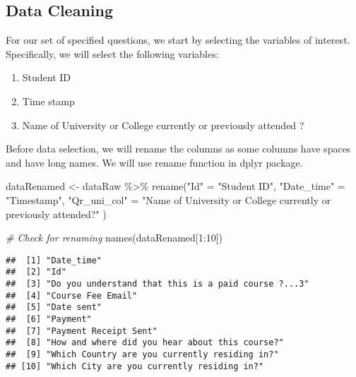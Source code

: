 \documentclass[
]{article}
\newenvironment{Shaded}{\begin{snugshade}}{\end{snugshade}}
\newcommand{\CommentTok}[1]{\textcolor[rgb]{0.56,0.35,0.01}{\textit{#1}}}
\newcommand{\DecValTok}[1]{\textcolor[rgb]{0.00,0.00,0.81}{#1}}
\newcommand{\FunctionTok}[1]{\textcolor[rgb]{0.00,0.00,0.00}{#1}}
\newcommand{\NormalTok}[1]{#1}
\newcommand{\OtherTok}[1]{\textcolor[rgb]{0.56,0.35,0.01}{#1}}
\newcommand{\SpecialCharTok}[1]{\textcolor[rgb]{0.00,0.00,0.00}{#1}}
\newcommand{\StringTok}[1]{\textcolor[rgb]{0.31,0.60,0.02}{#1}}
\providecommand{\tightlist}{%
  \setlength{\itemsep}{0pt}\setlength{\parskip}{0pt}}
\begin{document}
\hypertarget{data-cleaning}{%
\subsection{Data Cleaning}\label{data-cleaning}}

For our set of specified questions, we start by selecting the variables
of interest. Specifically, we will select the following variables:

\begin{enumerate}
\def\labelenumi{\arabic{enumi}.}
\tightlist
\item
  Student ID
\item
  Time stamp
\item
  Name of University or College currently or previously attended ?
\end{enumerate}

Before data selection, we will rename the columns as some columns have
spaces and have long names. We will use rename function in dplyr
package.

\begin{Shaded}
\begin{Highlighting}[]
\NormalTok{dataRenamed }\OtherTok{\textless{}{-}}\NormalTok{ dataRaw }\SpecialCharTok{\%\textgreater{}\%}
  \FunctionTok{rename}\NormalTok{(}\StringTok{"Id"} \OtherTok{=} \StringTok{"Student ID"}\NormalTok{,}
         \StringTok{"Date\_time"} \OtherTok{=} \StringTok{"Timestamp"}\NormalTok{,}
         \StringTok{"Qr\_uni\_col"} \OtherTok{=} \StringTok{"Name of University or College currently or previously attended?"}
\NormalTok{         )}

\CommentTok{\# Check for renaming}
\FunctionTok{names}\NormalTok{(dataRenamed[}\DecValTok{1}\SpecialCharTok{:}\DecValTok{10}\NormalTok{])}
\end{Highlighting}
\end{Shaded}

\begin{verbatim}
##  [1] "Date_time"                                         
##  [2] "Id"                                                
##  [3] "Do you understand that this is a paid course ?...3"
##  [4] "Course Fee Email"                                  
##  [5] "Date sent"                                         
##  [6] "Payment"                                           
##  [7] "Payment Receipt Sent"                              
##  [8] "How and where did you hear about this course?"     
##  [9] "Which Country are you currently residing in?"      
## [10] "Which City are you currently residing in?"
\end{verbatim}
\end{document}
